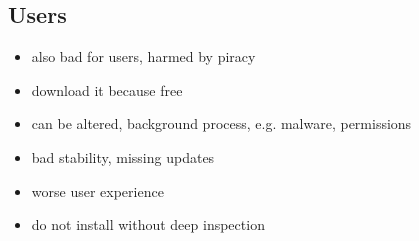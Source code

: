 \subsection{Users} \label{subsection:foundation-piracy-users}
\begin{itemize}
    \item also bad for users, harmed by piracy
    \item download it because free
    \item can be altered, background process, e.g. malware, permissions
    \item bad stability, missing updates
    \item worse user experience
    \item do not install without deep inspection
\end{itemize}
